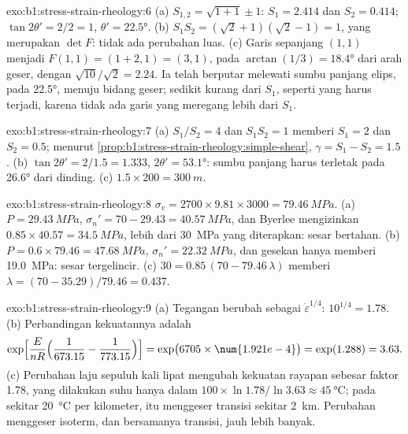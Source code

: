\begin{solution}{exo:b1:stress-strain-rheology:6}
(a) $S_{1,2} = \sqrt{1 + 1} \pm 1$: $S_1 = 2.414$ dan $S_2 = 0.414$;
$\tan2\theta' = 2/2 = 1$, $\theta' = \ang{22.5}$. (b) $S_1S_2 =
(\sqrt2 + 1)(\sqrt2 - 1) = 1$, yang merupakan $\det F$: tidak ada perubahan luas. (c) Garis
sepanjang $(1, 1)$ menjadi $F(1, 1) = (1 + 2, 1) = (3, 1)$, pada
$\arctan(1/3) = \ang{18.4}$ dari arah geser, dengan 
$\sqrt{10}/\sqrt2 = 2.24$. Ia telah berputar melewati sumbu panjang elips,
pada \ang{22.5}, menuju bidang geser;  sedikit kurang dari
$S_1$, seperti yang harus terjadi, karena tidak ada garis yang meregang lebih dari $S_1$.
\end{solution}

\begin{solution}{exo:b1:stress-strain-rheology:7}
(a) $S_1/S_2 = 4$ dan $S_1S_2 = 1$ memberi $S_1 = 2$ dan $S_2 = 0.5$; menurut
\cref{prop:b1:stress-strain-rheology:simple-shear}, $\gamma = S_1 - S_2 =
1.5$. (b) $\tan2\theta' = 2/1.5 = 1.333$, $2\theta' = \ang{53.1}$: sumbu panjang harus
terletak pada \ang{26.6} dari dinding. (c) $1.5\times200 = \qty{300}{m}$.
\end{solution}

\begin{solution}{exo:b1:stress-strain-rheology:8}
$\sigma_v = 2700\times9.81\times3000 = \qty{79.46}{MPa}$. (a) $P = \qty{29.43}{MPa}$,
$\sigma_n' = 70 - 29.43 = \qty{40.57}{MPa}$, dan Byerlee mengizinkan
$0.85\times40.57 = \qty{34.5}{MPa}$, lebih dari \qty{30}{MPa} yang diterapkan: sesar
bertahan. (b) $P = 0.6\times79.46 = \qty{47.68}{MPa}$, $\sigma_n' =
\qty{22.32}{MPa}$, dan gesekan hanya memberi \qty{19.0}{MPa}: sesar
tergelincir. (c) $30 = 0.85\,(70 - 79.46\,\lambda)$ memberi $\lambda = (70 -
35.29)/79.46 = 0.437$.
\end{solution}

\begin{solution}{exo:b1:stress-strain-rheology:9}
(a) Tegangan berubah sebagai $\dot\varepsilon^{1/4}$: $10^{1/4} = 1.78$. (b) Perbandingan kekuatannya adalah
\[
  \exp\Bigl[\frac{E}{nR}\Bigl(\frac{1}{673.15} - \frac{1}{773.15}\Bigr)\Bigr]
  = \exp\bigl(6705\times\num{1.921e-4}\bigr) = \exp(1.288) = 3.63 .
\]
(c) Perubahan laju sepuluh kali lipat mengubah kekuatan rayapan sebesar faktor 1.78, yang
dilakukan suhu hanya dalam $100\times\ln1.78/\ln3.63 \approx
\qty{45}{\degreeCelsius}$; pada  sekitar \qty{20}{\degreeCelsius}
per kilometer, itu menggeser transisi sekitar \qty{2}{km}. Perubahan  menggeser isoterm,
dan bersamanya transisi, jauh lebih banyak.
\end{solution}

